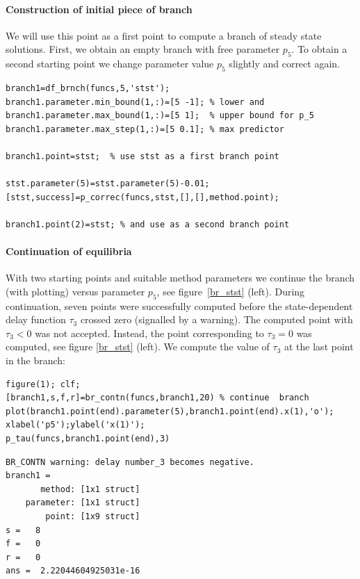 \documentclass[10pt]{scrartcl}
\begin{document}
\paragraph{Construction of initial piece of branch}
We will use this point as a first point to compute a branch
of steady state solutions. 
First, we obtain an empty branch with free parameter $p_5$.
To obtain a second starting point we change parameter value $p_5$ 
slightly and correct again.
\begin{lstlisting}
branch1=df_brnch(funcs,5,'stst');
branch1.parameter.min_bound(1,:)=[5 -1]; % lower and
branch1.parameter.max_bound(1,:)=[5 1];  % upper bound for p_5
branch1.parameter.max_step(1,:)=[5 0.1]; % max predictor 

branch1.point=stst;  % use stst as a first branch point

stst.parameter(5)=stst.parameter(5)-0.01;                
[stst,success]=p_correc(funcs,stst,[],[],method.point);  

branch1.point(2)=stst; % and use as a second branch point  
\end{lstlisting}

\paragraph{Continuation of equilibria}
With two starting points and suitable method parameters
we continue the branch (with plotting) versus parameter $p_5$,
see figure~\ref{br_stst} (left).
During continuation, seven points were successfully computed
before the state-dependent delay function $\tau_3$ crossed zero 
(signalled by a warning). 
The computed point with $\tau_3<0$ was not accepted. Instead, the point 
corresponding to $\tau_3=0$ was computed, see figure
\ref{br_stst} (left). We compute the value of $\tau_3$ at 
the last point in the branch:
\begin{lstlisting}
figure(1); clf;
[branch1,s,f,r]=br_contn(funcs,branch1,20) % continue  branch
plot(branch1.point(end).parameter(5),branch1.point(end).x(1),'o');
xlabel('p5');ylabel('x(1)');
p_tau(funcs,branch1.point(end),3)  
\end{lstlisting}
{\small
\begin{verbatim}
BR_CONTN warning: delay number_3 becomes negative.
branch1 = 
       method: [1x1 struct]
    parameter: [1x1 struct]
        point: [1x9 struct]
s =   8
f =   0
r =   0
ans =  2.22044604925031e-16
\end{verbatim}}
\end{document}
